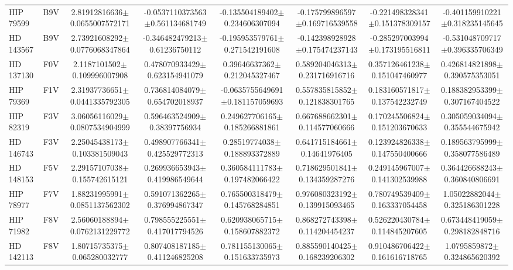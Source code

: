 \begin{table}
\begin{center}
\begin{tabular}{l|c|c|c|c|c|c|c}
HIP 79599 & B9V & 2.81912816636$\pm$0.0655007572171 & -0.0537110373563$\pm$0.561134681749 & -0.135504189402$\pm$0.234606307094 & -0.175799896597$\pm$0.169716539558 & -0.221498328341$\pm$0.151378309157 & -0.401159910221$\pm$0.318235145645 \\
HD 143567 & B9V & 2.73921608292$\pm$0.0776068347864 & -0.346482479213$\pm$0.61236750112 & -0.195953579761$\pm$0.271542191608 & -0.142398928928$\pm$0.175474237143 & -0.285297003994$\pm$0.173195516811 & -0.531048709717$\pm$0.396335706349 \\
HD 137130 & F0V & 2.1187101502$\pm$0.109996007908 & 0.478070933429$\pm$0.623154941079 & 0.39646637362$\pm$0.212045327467 & 0.589204046313$\pm$0.231716916716 & 0.357126461238$\pm$0.151047460977 & 0.426814821898$\pm$0.390575353051 \\
HIP 79369 & F1V & 2.31937736651$\pm$0.0441335792305 & 0.736814084079$\pm$0.654702018937 & -0.0635755649691$\pm$0.181157059693 & 0.557835815852$\pm$0.121838301765 & 0.183160571817$\pm$0.137542232749 & 0.188382953399$\pm$0.307167404522 \\
HIP 82319 & F3V & 3.06056116029$\pm$0.0807534904999 & 0.596463524909$\pm$0.38397756934 & 0.249627706165$\pm$0.185266881861 & 0.667688662301$\pm$0.114577060666 & 0.170245506824$\pm$0.151203670633 & 0.305059034094$\pm$0.355544675942 \\
HD 146743 & F3V & 2.25045438173$\pm$0.103381509043 & 0.498907766341$\pm$0.425529772313 & 0.28519774038$\pm$0.188893372889 & 0.641715184661$\pm$0.14641976405 & 0.123924826338$\pm$0.147550400666 & 0.189563795999$\pm$0.358077586489 \\
HD 148153 & F5V & 2.29157107038$\pm$0.155742615121 & 0.269936653943$\pm$0.419986549644 & 0.360584111783$\pm$0.197482066422 & 0.718629501841$\pm$0.134359287276 & 0.249145967007$\pm$0.141302539988 & 0.364426688243$\pm$0.360840806691 \\
HIP 78977 & F7V & 1.88231995991$\pm$0.0851137562302 & 0.591071362265$\pm$0.376994867347 & 0.765500318479$\pm$0.145768284851 & 0.976080323192$\pm$0.139915093465 & 0.780749539409$\pm$0.163337054458 & 1.05022882044$\pm$0.325186301228 \\
HIP 71982 & F8V & 2.56060188894$\pm$0.0762131229772 & 0.798555225551$\pm$0.417017794526 & 0.620938065715$\pm$0.158607882372 & 0.868272743398$\pm$0.114204454237 & 0.526220430784$\pm$0.114845207605 & 0.673448419059$\pm$0.298182848716 \\
HD 142113 & F8V & 1.80715735375$\pm$0.065280032777 & 0.807408187185$\pm$0.411246825208 & 0.781155130065$\pm$0.151633735973 & 0.885590140425$\pm$0.168239206302 & 0.910486706422$\pm$0.161616718765 & 1.0795859872$\pm$0.324865620392 \\

\end{tabular}
\end{center}
\end{table}
